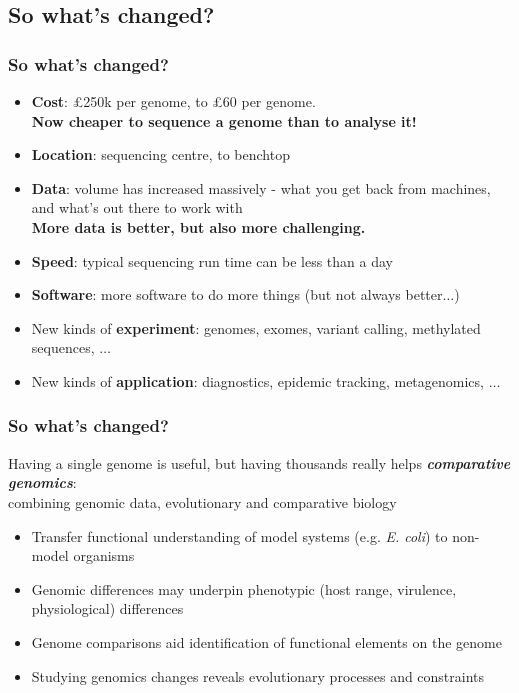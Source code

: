 \subsection{So what's changed?}

\begin{frame}
  \frametitle{So what's changed?}
  \begin{itemize}
    \item \textbf{Cost}: \pounds250k per genome, to \pounds60 per genome. \\
             \textbf{Now cheaper to sequence a genome than to analyse it!}
    \item \textbf{Location}: sequencing centre, to benchtop
    \item \textbf{Data}: volume has increased massively - what you get back from machines, and what's out there to work with\\
             \textbf{More data is better, but also more challenging.}
    \item \textbf{Speed}: typical sequencing run time can be less than a day
    \item \textbf{Software}: more software to do more things (but not always better$\ldots$)
    \item New kinds of \textbf{experiment}: genomes, exomes, variant calling, methylated sequences, $\ldots$
    \item New kinds of \textbf{application}: diagnostics, epidemic tracking, metagenomics, $\ldots$
  \end{itemize}       
\end{frame}

\begin{frame}
  \frametitle{So what's changed?}
  Having a single genome is useful, but having thousands really helps \textbf{\textit{comparative genomics}}: \\
  combining genomic data, evolutionary and comparative biology
  \begin{itemize}
    \item Transfer functional understanding of model systems (e.g. \textit{E. coli}) to non-model organisms
    \item Genomic differences may underpin phenotypic (host range, virulence, physiological) differences
    \item Genome comparisons aid identification of functional elements on the genome
    \item Studying genomics changes reveals evolutionary processes and constraints
  \end{itemize}       
\end{frame}

